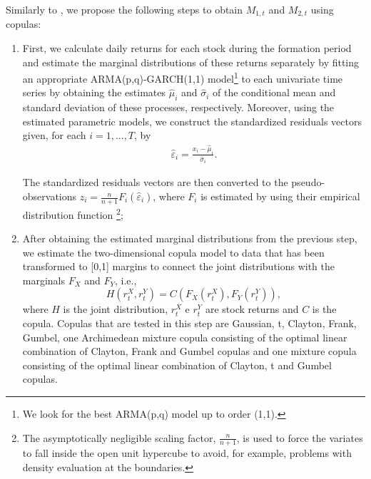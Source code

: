 \documentclass[a4paper]{article}
\begin{document}
	Similarly to \citet*{rf15}, we propose the following steps to obtain $M_{1,t}$ and $M_{2,t}$ using copulas: 
	
	\begin{enumerate}
		
\item First, we calculate daily returns for each stock during the formation period and
estimate the marginal distributions of these returns separately by fitting an appropriate ARMA(p,q)-GARCH(1,1) model\footnote{We look for the best ARMA(p,q) model up to order (1,1).} to each univariate time series by obtaining the estimates $\widehat{\mu }_{i}$ and $\widehat{\sigma }_{i}$ of the conditional mean and standard deviation of these processes, respectively. Moreover, using the estimated parametric models, we construct the standardized residuals vectors given, for each $i=1,...,T$, by
	\begin{equation}
	\begin{aligned}
	\widehat{\varepsilon }_{i}=\frac{x_{i}-\widehat{\mu }_{i}}{\widehat{\sigma }_{i}}.
	\end{aligned}
	\label{eq:eq32}
	\end{equation}
	
	The standardized residuals vectors are then converted to the pseudo-observations $z_{i}=\frac{n}{n+1}F_{i}\left( \widehat{\varepsilon }_{i}\right) $, where $F_{i}$ is estimated by using their empirical distribution function \footnote{The asymptotically negligible scaling factor, $\frac{n}{n+1}$, is used to force the variates to fall inside the open unit hypercube to avoid, for example, problems with density evaluation at the boundaries.}; 
	
	\vspace{0.6cm}
	
\item After obtaining the estimated marginal distributions from the previous step, we estimate the two-dimensional copula model to data that has been transformed to [0,1] margins to connect the joint distributions with the marginals $F_{X}$ and $F_{Y}$, i.e.,
		\[
		H\left( r_{t}^{X},r_{t}^{Y}\right) =C\left(F_{X}\left( r_{t}^{X}\right)
		,F_{Y}\left( r_{t}^{Y}\right) \right) , 
		\]%
		where $H$ is the joint distribution, $r_{t}^{X}$ e $r_{t}^{Y}$ are stock
		returns and $C$ is the copula. Copulas that are tested in this step are Gaussian, t, Clayton, Frank, Gumbel, one Archimedean mixture copula consisting of the optimal linear combination of Clayton, Frank and Gumbel copulas and one mixture copula consisting of the optimal linear combination of Clayton, t and Gumbel copulas.
	

\end{enumerate}
\end{document}
